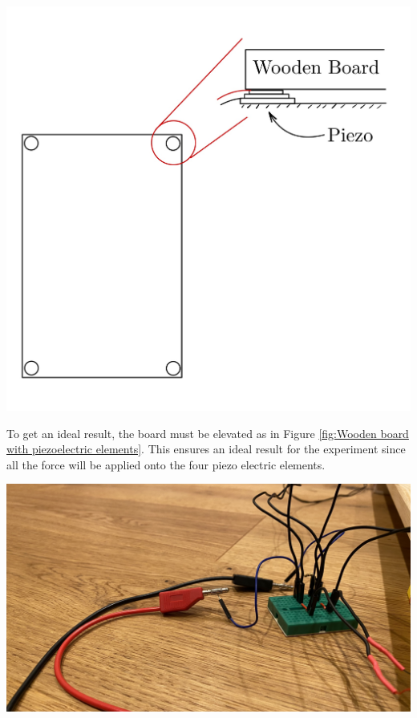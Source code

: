 \begin{minipage}{0.33\textwidth}
    \includegraphics[width=\textwidth]{./Figure_7.jpg}
    \label{fig:Wooden board with piezoelectric elements}
\end{minipage}
\begin{minipage}{0.66\textwidth}
    To get an ideal result, the board must be elevated as in Figure \ref{fig:Wooden board with piezoelectric elements}. This ensures an ideal result for the experiment since all the force will be applied onto the four piezo electric elements.\\
\end{minipage}
\begin{minipage}{0.33\textwidth}
    \includegraphics[width=\textwidth]{./Figure_8.jpg}
    \label{fig:Piezoelectric Elements connected in parallel}
\end{minipage}

